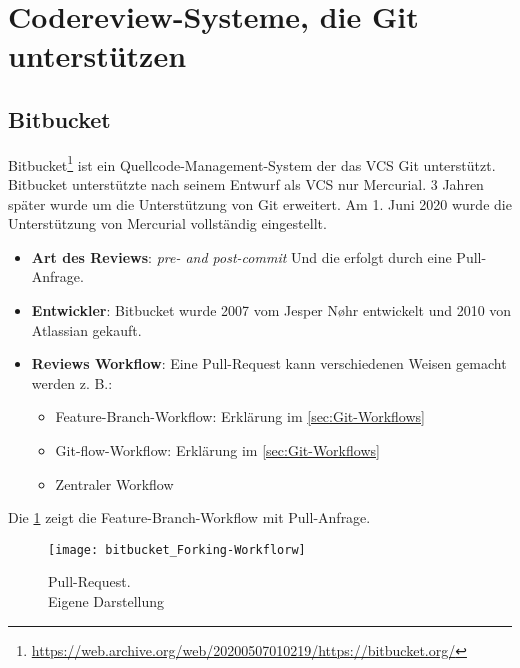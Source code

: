 \section{Codereview-Systeme, die Git unterstützen}
\label{sec:CRS-Git}

\subsection{Bitbucket}
\label{subsec:Bitbucket}

Bitbucket\footnote{\url{https://web.archive.org/web/20200507010219/https://bitbucket.org/}} ist ein Quellcode-Management-System der das \ac{VCS} Git unterstützt. Bitbucket unterstützte nach seinem Entwurf als \ac{VCS} nur Mercurial. 3 Jahren später wurde um die Unterstützung von Git erweitert. Am 1. Juni 2020 wurde die Unterstützung von Mercurial vollständig eingestellt.

\begin{itemize}
	\item \textbf{Art des Reviews}: \textit{pre- and post-commit} Und die erfolgt durch eine Pull-Anfrage.
	\item \textbf{Entwickler}: Bitbucket wurde 2007 vom Jesper Nøhr entwickelt und 2010 von Atlassian
		 gekauft. 
	\item \textbf{Reviews Workflow}: Eine Pull-Request kann verschiedenen Weisen gemacht werden z. B.:
		\begin{itemize}
			\item Feature-Branch-Workflow: Erklärung im \cref{sec:Git-Workflows}
			\item Git-flow-Workflow: Erklärung im \cref{sec:Git-Workflows}
			\item Zentraler Workflow
		\end{itemize}
\end{itemize}

Die \cref{fig:Forking-workflow} zeigt die Feature-Branch-Workflow mit Pull-Anfrage.

\begin{figure}[H]
	\centering
	\texttt{[image: bitbucket\_Forking-Workflorw]}
	\caption[Feature-Branch-Workflow]{Pull-Request.\\Eigene Darstellung}
	\label{fig:Forking-workflow}
\end{figure}		  

